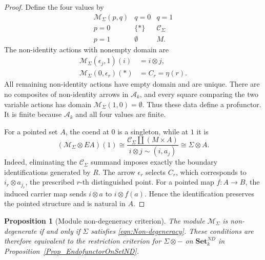 \documentclass{sn-jnl}%
\theoremstyle{thmstyleone}%
\newtheorem{proposition}[theorem]{Proposition}%
\theoremstyle{thmstyletwo}%
\theoremstyle{thmstylethree}%
\newcommand{\setnd}{\mathbf{Set}_{k}^{ND}}
\newcommand{\M}{\Sigma}
\newcommand{\F}{\M\otimes}
\begin{document}
\begin{appendices}
\begin{proof}
Define the four values by
    \begin{equation} 
    \nonumber
    \begin{array}{c|cc}
        \mathcal M_\Sigma(p,q)&q=0&q=1\\ \hline
        p=0&\{*\}&\mathcal C_\Sigma\\
        p=1&\emptyset&M.
    \end{array}
    \end{equation}
The non-identity actions with nonempty domain are
\begin{equation} 
\nonumber
\begin{aligned}
    \mathcal M_\Sigma(\epsilon_j,1)(i) & =i\otimes j,\\
    \mathcal M_\Sigma(0,\epsilon_r)(*)&=C_r=\eta(r).
\end{aligned}
\end{equation}
All remaining non-identity actions have empty domain and are unique. There are no composites of non-identity arrows in $\mathcal A_k$, and every square comparing the two variable actions has domain $\mathcal M_\Sigma(1,0)=\emptyset$. Thus these data define a profunctor. It is finite because $\mathcal A_k$ and all four values are finite.

For a pointed set $A$, the coend at $0$ is a singleton, while at $1$ it is
\begin{equation} 
\nonumber
    (\mathcal M_\Sigma\otimes EA)(1) \cong \frac{\mathcal C_\Sigma\amalg(M\times A)} {i\otimes j\sim(i,a_j)}
    \cong\F A.
\end{equation}
Indeed, eliminating the $\mathcal C_\Sigma$ summand imposes exactly the boundary identifications generated by $R$. The arrow $\epsilon_r$ selects $C_r$, which corresponds to $i_r\otimes a_{j_r}$, the prescribed $r$-th distinguished point. For a pointed map $f:A\to B$, the induced carrier map sends $i\otimes a$ to $i\otimes f(a)$. Hence the identification preserves the pointed structure and is natural in $A$.
\end{proof}

\begin{proposition}[Module non-degeneracy criterion]
\label{Prop_RNondegenerate_ModuleNondegenerate}
    The module $\mathcal M_\Sigma$ is non-degenerate if and only if $\Sigma$ satisfies \eqref{eqn:Non-degeneracy}. These conditions are therefore equivalent to the restriction criterion for $\F-$ on $\setnd$ in Proposition~\ref{Prop_EndofunctorOnSetND}.
\end{proposition}


\end{appendices}
\end{document}
